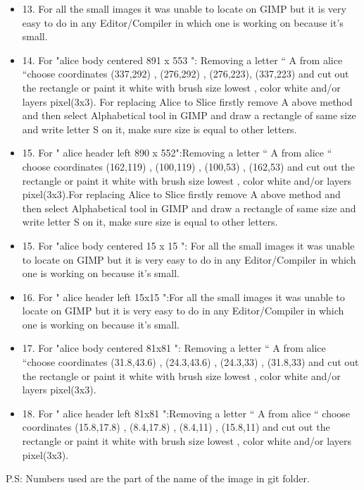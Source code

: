 \documentclass[a4paper]{article}
\begin{document}
\begin{itemize}
\item 13. For all the small images it was unable to locate on GIMP but it is very easy to do in any Editor/Compiler in which one is working on because it's small.
\item 14. For "alice body centered 891 x 553 ": Removing a letter “ A  from alice “choose coordinates (337,292) , (276,292) , (276,223), (337,223) and cut out the rectangle or paint it white with brush size lowest , color white and/or layers pixel(3x3). For replacing Alice to Slice firstly remove A above method and then select Alphabetical tool in GIMP and draw a rectangle of same size and write letter S on it, make sure size is equal to other letters.
\item 15. For " alice header left 890 x 552":Removing a letter “ A from alice “ choose coordinates (162,119) , (100,119) , (100,53) , (162,53) and cut out the rectangle or paint it white with brush size lowest  , color white and/or layers pixel(3x3).For replacing Alice to Slice firstly remove A above method and then select Alphabetical tool in GIMP and draw a rectangle of same size and write letter S on it, make sure size is equal to other letters.
\item 15. For "alice body centered 15 x 15 ": For all the small images it was unable to locate on GIMP but it is very easy to do in any Editor/Compiler in which one is working on because it's small.
\item 16. For " alice header left 15x15 ":For all the small images it was unable to locate on GIMP but it is very easy to do in any Editor/Compiler in which one is working on because it's small.
\item 17. For "alice body centered 81x81 ": Removing a letter “ A  from alice “choose coordinates (31.8,43.6) , (24.3,43.6) , (24.3,33) , (31.8,33) and cut out the rectangle or paint it white with brush size lowest , color white and/or layers pixel(3x3).
\item 18.  For " alice header left 81x81 ":Removing a letter “ A from alice “ choose coordinates (15.8,17.8) , (8.4,17.8) , (8.4,11) , (15.8,11) and cut out the rectangle or paint it white with brush size lowest  , color white and/or layers pixel(3x3).

\end{itemize}

P.S: Numbers used are the part of the name of the image in git folder.
\end{document}

